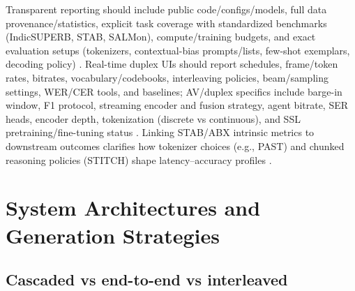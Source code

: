 \documentclass{article}
\begin{document}
Transparent reporting should include public code/configs/models, full data provenance/statistics, explicit task coverage with standardized benchmarks (IndicSUPERB, STAB, SALMon), compute/training budgets, and exact evaluation setups (tokenizers, contextual-bias prompts/lists, few-shot exemplars, decoding policy) \cite{vashishth2024stabspeechtokenizerassessmentbenchmark,entry2025indicsuperbspeechprocessinguniversalperf,maimon2025salmonsuiteacousticlanguagemodelevaluati,chen2023reducingbarriersselfsupervisedlearninghu,sun2023contextualbiasingnamedentitieslargelangu}. Real-time duplex UIs should report schedules, frame/token rates, bitrates, vocabulary/codebooks, interleaving policies, beam/sampling settings, WER/CER tools, and baselines; AV/duplex specifics include barge-in window, F1 protocol, streaming encoder and fusion strategy, agent bitrate, SER heads, encoder depth, tokenization (discrete vs continuous), and SSL pretraining/fine-tuning status \cite{yang2024buildingtaiwanesemandarinspokenlanguagem,wang2023slmbridgethingapbetweenspeechtextfoundat,maimon2025salmonsuiteacousticlanguagemodelevaluati,entry2025indicsuperbspeechprocessinguniversalperf,li2025continuousspeechtokenizertext,hu2025salmduplexefficientdirectmodelingspeechl,chen2023reducingbarriersselfsupervisedlearninghu}. Linking STAB/ABX intrinsic metrics to downstream outcomes clarifies how tokenizer choices (e.g., PAST) and chunked reasoning policies (STITCH) shape latency--accuracy profiles \cite{har-tuv2025pastphoneticacousticspeechtokenizer,fily2024establishingdegreesclosenessbetweenaudio,vashishth2024stabspeechtokenizerassessmentbenchmark,entry2025indicsuperbspeechprocessinguniversalperf,chiang2025stitchsimultaneousthinkingtalkingchunked}.

















\section{System Architectures and Generation Strategies} \label{sec:System Architectures and Generation Strategies}

\subsection{Cascaded vs end-to-end vs interleaved} \label{subsec:Cascaded vs end-to-end vs interleaved}

\end{document}
